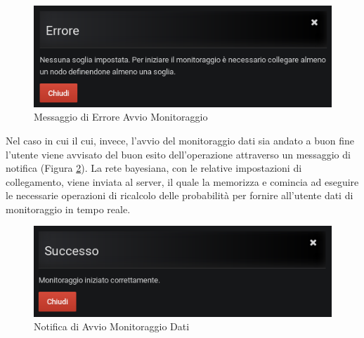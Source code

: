 \begin{figure}[H]
	\begin{center}
		\includegraphics[scale=0.6]{./images/ErroreAvvio.png}
		 \caption{Messaggio di Errore Avvio Monitoraggio}	
		 \label{ErroreAvvio}
	\end{center}
\end{figure}

Nel caso in cui il cui, invece, l'avvio del monitoraggio dati sia andato a buon fine l'utente viene avvisato del buon esito dell'operazione attraverso un messaggio di notifica (Figura \ref{NotificaMonitoraggio}). La rete bayesiana, con le relative impostazioni di collegamento, viene inviata al server, il quale la memorizza e comincia ad eseguire le necessarie operazioni di ricalcolo delle probabilità per fornire all'utente dati di monitoraggio in tempo reale.

\begin{figure}[H]
	\begin{center}
		\includegraphics[scale=0.6]{./images/NotificaMonitoraggio.png}
		 \caption{Notifica di Avvio Monitoraggio Dati}	
		 \label{NotificaMonitoraggio}
	\end{center}
\end{figure}


